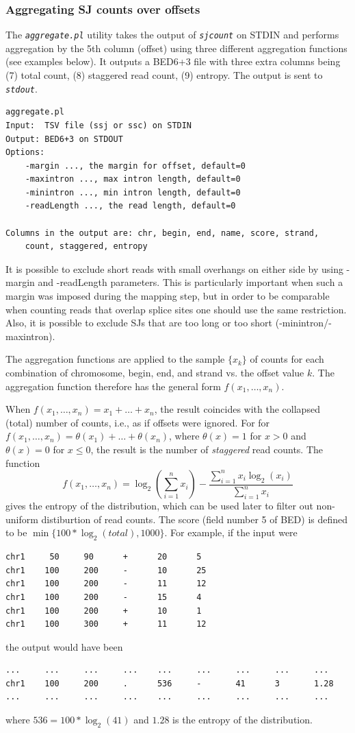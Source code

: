 \documentclass{article}
\newcommand{\prog}[1]{{\tt\em #1}}
\begin{document}

\subsubsection{Aggregating SJ counts over offsets}
The \prog{aggregate.pl} utility takes the output of \prog{sjcount} on STDIN and performs aggregation by the 5th column (offset) using three different aggregation functions 
(see examples below). It outputs a BED6+3 file with three extra columns being (7) total count, (8) staggered read count, (9) entropy. The output is sent to \prog{stdout}. 
\begin{verbatim}
aggregate.pl   
Input:  TSV file (ssj or ssc) on STDIN
Output: BED6+3 on STDOUT
Options:
	-margin ..., the margin for offset, default=0
	-maxintron ..., max intron length, default=0
	-minintron ..., min intron length, default=0
	-readLength ..., the read length, default=0

Columns in the output are: chr, begin, end, name, score, strand, 
	count, staggered, entropy
\end{verbatim}
It is possible to exclude short reads with small overhangs on either side by using -margin and -readLength parameters. This is particularly important when such a margin 
was imposed during the mapping step, but in order to be comparable when counting reads that overlap splice sites one should use the same restriction. Also, it is possible 
to exclude SJs that are too long or too short (-minintron/-maxintron).

The aggregation functions are applied to the sample $\{x_k\}$ of counts for each combination of chromosome, begin, end, and strand vs. the offset value $k$. 
The aggregation function therefore has the general form $f(x_1,\dots,x_n)$. 

When $f(x_1,\dots,x_n) = x_1+\dots+x_n$, the result coincides with the collapsed (total) number of counts, i.e., as if offsets were ignored.
For for $f(x_1,\dots,x_n) = \theta(x_1)+\dots+\theta(x_n)$, where $\theta(x)=1$ for $x>0$ and $\theta(x)=0$ for $x\le0$, the result is the 
number of {\em staggered} read counts. The function 
$$f(x_1,\dots,x_n) = \log_2(\sum\limits_{i=1}^nx_i) - \frac{\sum\limits_{i=1}^nx_i\log_2(x_i)}{\sum\limits_{i=1}^nx_i}$$ 
gives the entropy of the distribution, which can be used later to filter out non-uniform distiburtion of read counts. The score (field number 5 of BED) is 
defined to be $\min\{100*\log_2(total), 1000\}$. For example, if the input were
\begin{verbatim}
chr1     50     90      +      20      5
chr1    100     200     -      10      25
chr1    100     200     -      11      12
chr1    100     200     -      15      4
chr1    100     200     +      10      1
chr1    100     300     +      11      12
\end{verbatim}
the output would have been
\begin{verbatim}
...     ...     ...     ...    ...     ...     ...     ...     ...
chr1    100     200     .      536     -       41      3       1.28
...     ...     ...     ...    ...     ...     ...     ...     ...
\end{verbatim}
where $536=100*\log_2(41)$ and $1.28$ is the entropy of the distribution.
\end{document}
